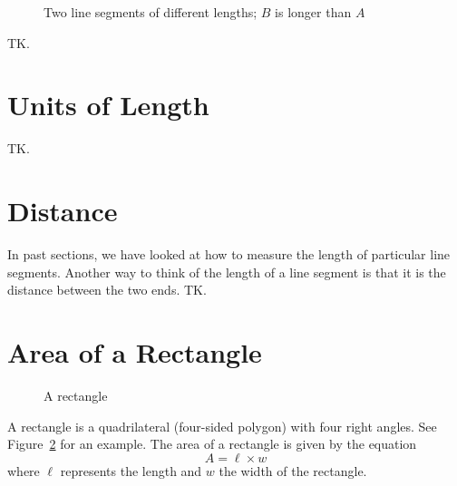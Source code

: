 \documentclass[a4paper,10pt]{report}
\begin{document}
\begin{figure}

  \caption{Two line segments of different lengths; \(B\) is longer than \(A\)}
  \label{ar:different-lengths}
\end{figure}

TK.

\section{Units of Length}

TK.

\section{Distance}

In past sections, we have looked at how to measure the length of particular
line segments. Another way to think of the length of a line segment is that it
is the distance between the two ends. TK.


\section{Area of a Rectangle}

\begin{figure}

  \caption{A rectangle}
  \label{ar:rectangle}
\end{figure}

A rectangle is a quadrilateral (four-sided polygon) with four right angles. See
Figure~\ref{ar:rectangle} for an example. The area of a rectangle is given by
the equation \begin{equation}
  A = \ell \times w
\end{equation} where \(\ell\) represents the length and \(w\) the width of the
rectangle.
\end{document}
